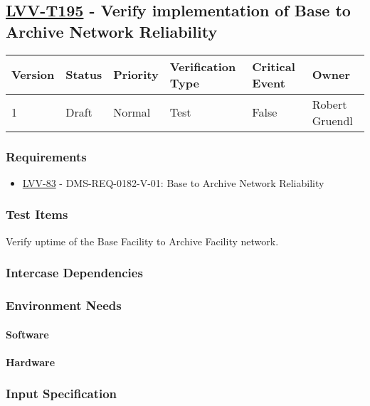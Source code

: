\subsection{\href{https://jira.lsstcorp.org/secure/Tests.jspa\#/testCase/LVV-T195}{LVV-T195}
    - Verify implementation of Base to Archive Network Reliability}\label{lvv-t195}

\begin{longtable}[]{llllll}
\toprule
Version & Status & Priority & Verification Type & Critical Event & Owner
\\\midrule
1 & Draft & Normal &
Test & False & Robert Gruendl
\\\bottomrule
\end{longtable}

\subsubsection{Requirements}
\begin{itemize}
\item \href{https://jira.lsstcorp.org/browse/LVV-83}{LVV-83} - DMS-REQ-0182-V-01: Base to Archive Network Reliability
\end{itemize}

\subsubsection{Test Items}
Verify uptime of the Base Facility to Archive Facility network.



\subsubsection{Intercase Dependencies}

\subsubsection{Environment Needs}

\paragraph{Software}

\paragraph{Hardware}

\subsubsection{Input Specification}

